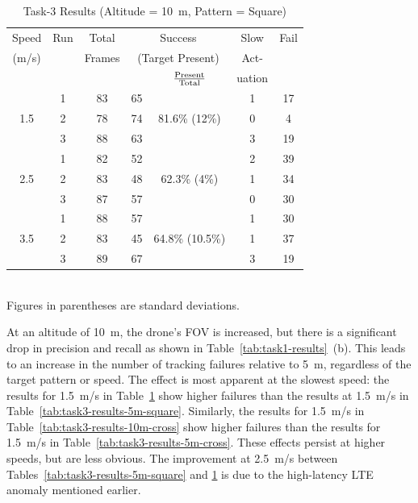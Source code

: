 \begin{table}
	\centering\small
	\begin{tabular}{|c|c|c|c|c|c|c|}
		\hline
		Speed & Run & Total & \multicolumn{2}{c|}{Success} & Slow & Fail\\
		(m/s) &  & Frames  & \multicolumn{2}{c|}{\footnotesize (Target Present)}& Act-  &  \\
		\cline{5-5} 
		&  &         &         & $\rm \frac{Present}{Total}$ & uation  & \\ 
		\hline
		& 1 & 83 & 65 & & 1 & 17 \\
		1.5 & 2 & 78 & 74 & 81.6\% \scriptsize{(12\%)}  & 0 & 4 \\
		& 3 & 88 & 63 & & 3 & 19\\
		\hline
		& 1 & 82 & 52 & & 2 & 39 \\
		2.5 & 2 & 83 & 48 & 62.3\% \scriptsize{(4\%)} & 1 & 34 \\
		& 3 & 87 & 57 & & 0 & 30 \\
		\hline
		& 1 & 88 & 57 & & 1 & 30 \\
		3.5 & 2 & 83 & 45 & 64.8\% \scriptsize{(10.5\%)} & 1 & 37  \\
		& 3 & 89 & 67 & & 3 & 19 \\
		\hline
	\end{tabular}
	\begin{captext}
		\centering \\[0.1cm] Figures in parentheses are standard deviations. \\
	\end{captext}
	\caption{Task-3 Results {\small (Altitude = 10~m, Pattern = Square)}}
	\label{tab:task3-results-10m-square}
\end{table}


At an altitude of 10~m, the drone's FOV is increased, but there is a
significant drop in precision and recall as shown in
Table~\ref{tab:task1-results}~(b).  This leads to an increase in the
number of tracking failures relative to 5~m, regardless of the target
pattern or speed.  The effect is most apparent at the slowest speed:
the results for 1.5~m/s in Table~\ref{tab:task3-results-10m-square}
show higher failures than the results at 1.5~m/s in
Table~\ref{tab:task3-results-5m-square}.  Similarly, the results for
1.5~m/s in Table~\ref{tab:task3-results-10m-cross} show higher
failures than the results for 1.5~m/s in
Table~\ref{tab:task3-results-5m-cross}. These effects persist at
higher speeds, but are less obvious.  The improvement at
2.5~m/s between Tables~\ref{tab:task3-results-5m-square} and
\ref{tab:task3-results-10m-square} is due to the high-latency LTE
anomaly mentioned earlier.

